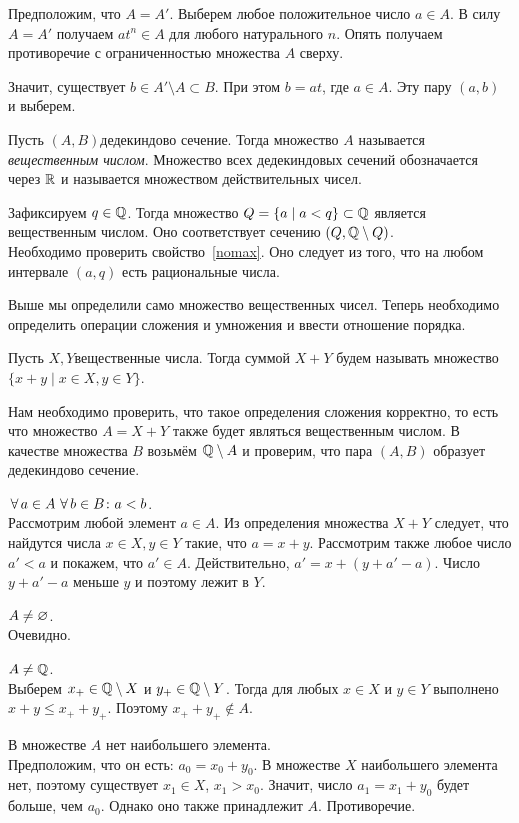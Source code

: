 \documentclass[a4paper,12pt]{article}
\begin{document}
Предположим, что $A = A'$. Выберем любое положительное число $a \in A$. В силу $A = A'$ получаем $at^n \in A$ для любого натурального $n$. Опять получаем противоречие с ограниченностью множества $A$ сверху.

Значит, существует $b \in A' \setminus A \subset B$. При этом $b = at$, где $a \in A$. Эту пару $(a,b)$ и выберем.

Пусть $(A,B)$\т дедекиндово сечение. Тогда множество $A$ называется \emph{вещественным числом}.
Множество всех дедекиндовых сечений обозначается через $\mathbb{R}$ и называется множеством действительных чисел.

Зафиксируем $q \in \mathbb{Q}$. Тогда множество $Q = \{a \mid a < q\} \subset \mathbb{Q}$ является вещественным числом. Оно соответствует сечению $(Q, \mathbb{Q} \setminus Q)$.\\
Необходимо проверить свойство~\ref{nomax}. Оно следует из того, что на любом интервале $(a,q)$ есть рациональные числа.

\bigskip
Выше мы определили само множество вещественных чисел. Теперь необходимо определить операции сложения и умножения и ввести отношение порядка.
\bigskip

Пусть $X,Y$\т вещественные числа. Тогда суммой $X + Y$ будем называть множество $\{x+y \mid x\in X, y\in Y\}$.

\bigskip
Нам необходимо проверить, что такое определения сложения корректно, то есть что множество $A = X+Y$ также будет являться вещественным числом. В качестве множества $B$ возьмём $\mathbb{Q} \setminus A$ и проверим, что пара $(A,B)$ образует дедекиндово сечение.
\begin{nums}{-3}
\item
$\,\forall\, a\in A \, \,\forall\, b \in B \colon a < b$.\\
Рассмотрим любой элемент $a\in A$. Из определения множества $X+Y$ следует, что найдутся числа $x\in X, y\in Y$ такие, что $a = x+y$. Рассмотрим также любое число $a' < a$ и покажем, что $a' \in A$. Действительно, $a' = x + (y+a'-a)$. Число $y+a'-a$ меньше $y$ и поэтому лежит в $Y$.
\item
$A \ne \varnothing$.\\
Очевидно.
\item
$A \ne \mathbb{Q}$.\\
Выберем $x_+ \in \mathbb{Q}\setminus X$ и $y_+ \in \mathbb{Q}\setminus Y$. Тогда для любых $x\in X$ и $y\in Y$ выполнено $x+y\le x_+ + y_+$. Поэтому $x_+ + y_+ \not\in A$.
\item
В множестве $A$ нет наибольшего элемента.\\
Предположим, что он есть: $a_0 = x_0 + y_0$. В множестве $X$ наибольшего элемента нет, поэтому существует $x_1 \in X$, $x_1 > x_0$. Значит, число $a_1 = x_1+y_0$ будет больше, чем $a_0$. Однако оно также принадлежит $A$. Противоречие.
\end{nums}
\end{document}
